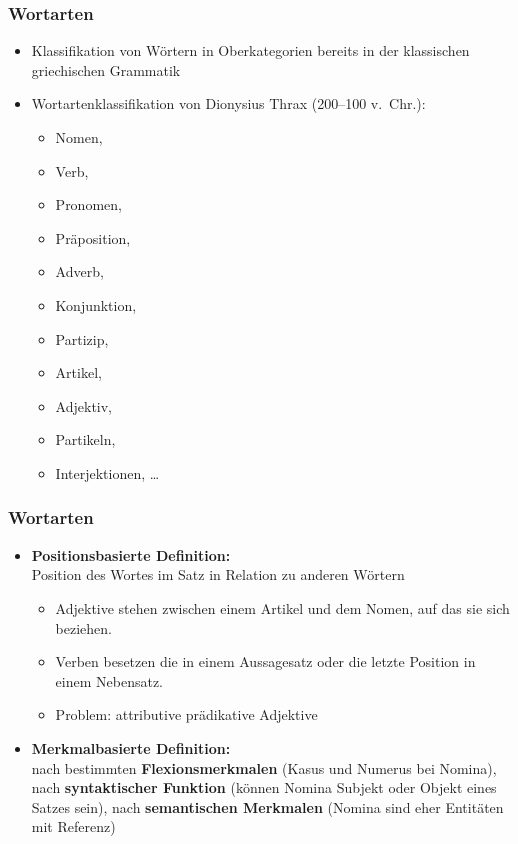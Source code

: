 \begin{frame}
\frametitle{Wortarten}

\begin{itemize}
	\item Klassifikation von Wörtern in Oberkategorien \ras bereits in der klassischen griechischen Grammatik
	\medskip
	\item Wortartenklassifikation von Dionysius Thrax (200--100 v.\ Chr.):
\pause
	\begin{itemize}
		\item Nomen,
		\item Verb, 
		\item Pronomen,
		\item Präposition,
		\item Adverb,
		\item Konjunktion,
		\item Partizip,
		\item Artikel,
	\end{itemize}
\pause
	\begin{itemize}
		\item Adjektiv,
		\item Partikeln,
		\item Interjektionen, \dots
	\end{itemize}
\end{itemize}

\nocite{Thrax74a}

\end{frame}


\begin{frame}
\frametitle{Wortarten}

\begin{itemize}
	\item \textbf{Positionsbasierte Definition:}\\
	Position des Wortes im Satz in Relation zu anderen Wörtern
	\begin{itemize}
		\item Adjektive stehen zwischen einem Artikel und dem Nomen, auf das sie sich beziehen.
		\item Verben besetzen \idR die  in einem Aussagesatz oder die letzte Position in einem Nebensatz.
		\item Problem: attributive \vs prädikative Adjektive
	\end{itemize}

	\medskip
	\item \textbf{Merkmalbasierte Definition:}\\
	nach bestimmten \textbf{Flexionsmerkmalen} (Kasus und Numerus bei Nomina), nach \textbf{syntaktischer Funktion} (\idR können Nomina Subjekt oder Objekt eines Satzes sein), nach \textbf{semantischen Merkmalen} (Nomina sind eher Entitäten mit Referenz)


\end{itemize}

\end{frame}


